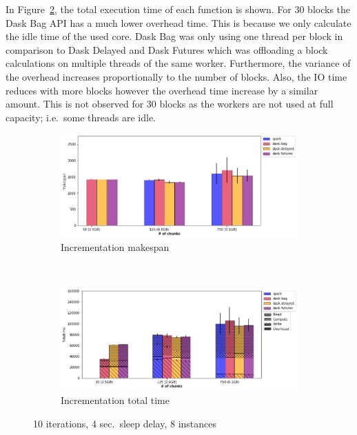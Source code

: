\documentclass[conference]{IEEEtran}
\begin{document}
In Figure~\ref{fig:inc_tt_block}, the total execution time of each function is shown.
For 30 blocks the Dask Bag API has a much lower overhead time. This is because we
only calculate the idle time of the used core. Dask Bag was only using one thread per
block in comparison to Dask Delayed and Dask Futures which was offloading a block
calculations on multiple threads of the same worker. Furthermore, the variance of the
overhead increases proportionally to the number of blocks. Also, the IO time reduces
with more blocks however the overhead time increase by a similar amount. This is not
observed for 30 blocks as the workers are not used at full capacity; i.e.\ some
threads are idle.

\begin{figure}[!t]
    \centering
    \begin{subfigure}[b]{\columnwidth}
        \includegraphics[clip,width=\columnwidth]{images/inc_block.png}%
        \caption{Incrementation makespan}\label{fig:inc_ms_block}
    \end{subfigure}
    \\
    \begin{subfigure}[b]{\columnwidth}
        \includegraphics[clip,width=\columnwidth]{images/inc_idle_block.png}%
        \caption{Incrementation total time}\label{fig:inc_tt_block}
    \end{subfigure}
    \caption{10 iterations, 4 sec.\ sleep delay, 8 instances}\label{fig:inc_block}
\end{figure}
\end{document}
